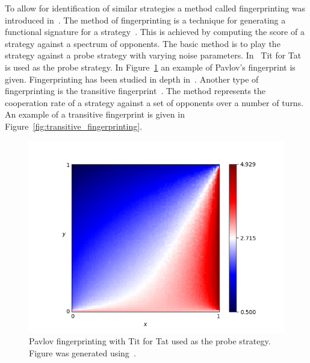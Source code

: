To allow for identification of similar strategies a method called
fingerprinting was introduced in~\cite{Ashlock2005}. The method of fingerprinting is a
technique for generating a functional signature for a
strategy~\cite{Ashlock2008}. This is achieved by computing the score of a
strategy against a spectrum of opponents. The basic method is to play the
strategy against a probe strategy with varying noise parameters.
In~\cite{Ashlock2005} Tit for Tat is used as the probe strategy. In
Figure~\ref{fig:fingerprinting} an example of Pavlov's fingerprint is given.
Fingerprinting has been studied in depth in~\cite{Ashlock2008, Ashlock2009,
Ashlock2010, Ashlock2006a}. Another type of fingerprinting is the
transitive fingerprint~\cite{axelrodproject}.
The method represents the cooperation rate of a strategy against a set of opponents
over a number of turns. An example of a transitive fingerprint is given in
Figure~\ref{fig:transitive_fingerprinting}.

\begin{figure}[!hbtp]
    \centering
    \includegraphics[height=.3\textheight]{src/chapters/chapters-02/Win-Stay_Lose-Shift.png}
    \caption{Pavlov fingerprinting with Tit for Tat used as the probe strategy.
    Figure was generated using~\cite{axelrodproject}.}
    \label{fig:fingerprinting}
\end{figure}

